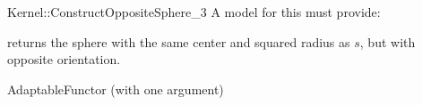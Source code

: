 \begin{ccRefFunctionObjectConcept}{Kernel::ConstructOppositeSphere_3}
A model for this must provide:


{ returns the sphere with the same center and squared radius as
  $s$, but with opposite orientation.}

\ccRefines
AdaptableFunctor (with one argument)

\ccSeeAlso
{} \\

\end{ccRefFunctionObjectConcept}
